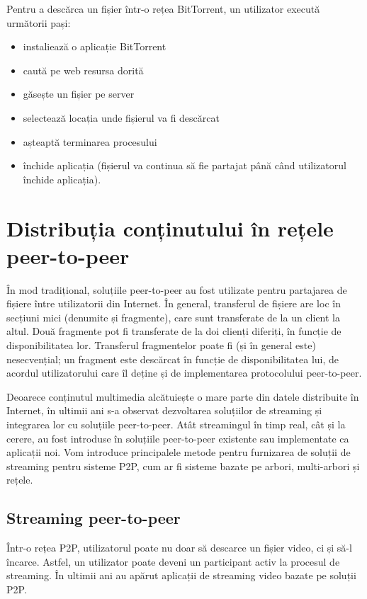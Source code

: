 Pentru a descărca un fișier într-o rețea BitTorrent, un utilizator execută
următorii pași:

\begin{itemize}
  \item instaliează o aplicație BitTorrent
  \item caută pe web resursa dorită
  \item găsește un fișier pe server
  \item selectează locația unde fișierul va fi descărcat
  \item așteaptă terminarea procesului
  \item închide aplicația (fișierul va continua să fie partajat
                până când utilizatorul închide aplicația).
\end{itemize}

\section{Distribuția conținutului în rețele peer-to-peer}
\label{sec:p2p-systems:streaming}

În mod tradițional, soluțiile peer-to-peer au fost utilizate pentru partajarea
de fișiere între utilizatorii din Internet. În general, transferul de fișiere
are loc în secțiuni mici (denumite și fragmente), care sunt transferate de
la un client la altul. Două fragmente pot fi transferate de la doi clienți
diferiți, în funcție de disponibilitatea lor. Transferul fragmentelor poate fi
(și în general este) nesecvențial; un fragment este descărcat în funcție de
disponibilitatea lui, de acordul utilizatorului care îl deține și de
implementarea protocolului peer-to-peer.

Deoarece conținutul multimedia alcătuiește o mare parte din datele distribuite
în Internet, în ultimii ani s-a observat dezvoltarea soluțiilor de streaming
și integrarea lor cu soluțiile peer-to-peer. Atât streamingul în timp real,
cât și la cerere, au fost introduse în soluțiile peer-to-peer existente sau
implementate ca aplicații noi. Vom introduce principalele metode pentru
furnizarea de soluții de streaming pentru sisteme P2P, cum ar fi sisteme
bazate pe arbori, multi-arbori și rețele.

\subsection{Streaming peer-to-peer}
\label{subsec:p2p-systems:p2p-streaming-p2p}

Într-o rețea P2P, utilizatorul poate nu doar să descarce un fișier video,
ci și să-l încarce. Astfel, un utilizator poate deveni un participant activ
la procesul de streaming. În ultimii ani au apărut aplicații de streaming video
bazate pe soluții P2P.

